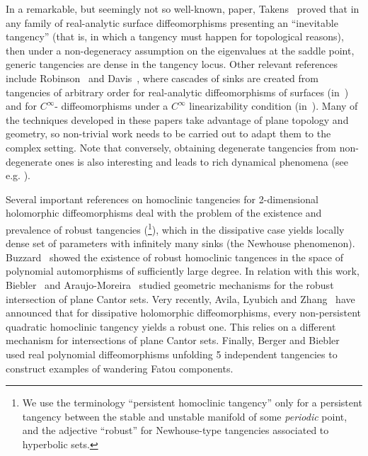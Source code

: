 \documentclass[11pt, oneside]{amsart}
\theoremstyle{remark}
\theoremstyle{definition}
\theoremstyle{theorem}
\newcommand{\commentaire}[1]{}
\begin{document}
In a remarkable, but seemingly not so well-known,
 paper, Takens~\cite{takens} proved that in any family of 
real-analytic surface diffeomorphisms presenting an ``inevitable tangency'' (that is, in  which 
 a tangency must happen for topological reasons), then under a non-degeneracy assumption on the 
 eigenvalues at the saddle point,  
 generic tangencies are dense in the tangency locus. Other relevant references include 
 Robinson~\cite{robinson} and Davis~\cite{davis},  
 where cascades of sinks are created from  tangencies of 
  arbitrary order for real-analytic diffeomorphisms of surfaces (in~\cite{robinson}) and for $C^\infty$-
  diffeomorphisms under a $C^\infty$ linearizability condition (in~\cite{davis}).
 Many of the techniques developed in these papers take advantage of   plane topology and  
 geometry,   so non-trivial work needs  to be carried out to  adapt them to the complex setting. 
  Note that conversely, obtaining degenerate tangencies from non-degenerate ones  is also interesting 
  and leads to rich dynamical phenomena (see e.g. \cite{gonchenko_turaev_shilnikov, gonchenko_turaev_shilnikov2}).

\commentaire{Expo. Rmk \#8: paragraph added}
Several important  
references on homoclinic tangencies for 2-dimensional holomorphic diffeomorphisms deal with 
the problem of  the existence and prevalence of robust tangencies
(\footnote{We use the terminology  ``persistent homoclinic tangency'' only for a persistent tangency between the stable and unstable 
manifold of some \emph{periodic} point, and the adjective ``robust'' for Newhouse-type tangencies 
associated to hyperbolic sets.}), which in the dissipative case yields locally dense set of parameters 
  with infinitely many sinks  (the Newhouse phenomenon). Buzzard~\cite{buzzard:annals} showed the 
  existence of robust homoclinic tangences in the space of  polynomial automorphisms of sufficiently 
  large degree. 
 In relation with this work,  Biebler~\cite{biebler:gap} and Araujo-Moreira~\cite{araujo-moreira}    
 studied geometric   mechanisms for the  robust intersection  of plane Cantor sets.
  Very recently, Avila, Lyubich and Zhang~\cite{avila-lyubich-zhang} have  
  announced that  for dissipative holomorphic diffeomorphisms, 
  every non-persistent  quadratic homoclinic tangency yields a robust one. This relies on a different mechanism for intersections of plane Cantor sets. 
  Finally, Berger and Biebler~\cite{berger-biebler}   used real polynomial diffeomorphisms  unfolding  
  5 independent tangencies to construct examples  of  wandering Fatou components. 
\end{document}
